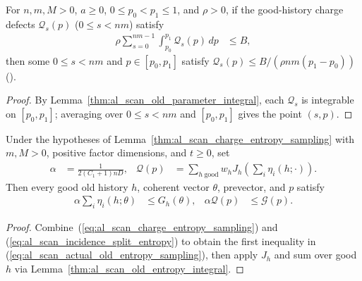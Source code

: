 \begin{lemma}
    \label{thm:al_scan_actual_charge_selection}
    \leanok
    For $n,m,M>0$, $a\ge0$, $0\le p_0<p_1\le1$, and $\rho>0$, if the good-history
    charge defects $\mathcal Q_s(p)$ ($0\le s<nm$) satisfy
    \begin{align}
        \rho\sum_{s=0}^{nm-1}\int_{p_0}^{p_1}\mathcal Q_s(p)\,dp & \le B,
        \label{eq:al_scan_charge_selection_hyp}
    \end{align}
    then some $0\le s<nm$ and $p\in[p_0,p_1]$ satisfy
    $\mathcal Q_s(p)\le B/(\rho nm(p_1-p_0))$ (\cite{OpenAI2026AreaLaw}).
\end{lemma}
\begin{proof}\leanok
    By Lemma~\ref{thm:al_scan_old_parameter_integral}, each $\mathcal Q_s$ is
    integrable on $[p_0,p_1]$; averaging over $0\le s<nm$ and $[p_0,p_1]$ gives
    the point $(s,p)$.
\end{proof}

\begin{lemma}
    \label{thm:al_scan_actual_old_entropy_sampling}
    \leanok
    Under the hypotheses of Lemma~\ref{thm:al_scan_charge_entropy_sampling}
    with $m,M>0$, positive factor dimensions, and $t\ge0$, set
    \begin{align}
        \alpha        & = \frac{1}{2(C_1+1)nD}, &
        \mathcal Q(p) & =
        \sum_{h\ \mathrm{good}} w_hJ_h\!\left(\sum_i\eta_i(h;\cdot)\right).
        \label{eq:al_scan_actual_old_entropy_sampling_defs}
    \end{align}
    Then every good old history $h$, coherent vector $\theta$, prevector, and
    $p$ satisfy
    \begin{align}
        \alpha\sum_i\eta_i(h;\theta) & \le G_h(\theta),   &
        \alpha\mathcal Q(p)          & \le \mathcal G(p).
        \label{eq:al_scan_actual_old_entropy_sampling}
    \end{align}
\end{lemma}
\begin{proof}\leanok
    Combine~(\ref{eq:al_scan_charge_entropy_sampling}) and
    (\ref{eq:al_scan_incidence_split_entropy}) to obtain the first inequality in
    (\ref{eq:al_scan_actual_old_entropy_sampling}), then apply $J_h$ and sum
    over good $h$ via Lemma~\ref{thm:al_scan_old_entropy_integral}.
\end{proof}

